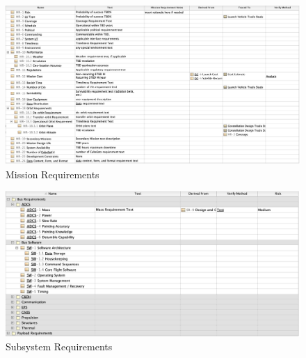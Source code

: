 \begin{figure}[H]
    \centering
    \includegraphics[width=\textwidth]{Thesis/Analysis_and_Results/Analysis and Results Figures/Mission Requirements.png}
    \caption{Mission Requirements}
    \label{fig:Mission Requirements}
\end{figure}

\begin{figure}[H]
    \centering
    \includegraphics[width=\textwidth]{Thesis/Analysis_and_Results/Analysis and Results Figures/Subsystem Requirements.png}
    \caption{Subsystem Requirements}
    \label{fig:Subsystem Requirements}
\end{figure}